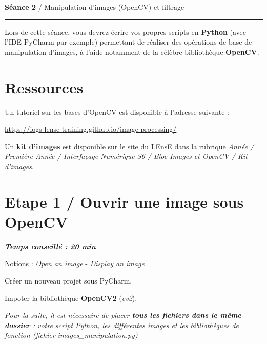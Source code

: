 \documentclass[a4paper,11pt,titlepage]{article} %
\begin{document}
{\noindent\Large \rule[-7pt]{0pt}{30pt} \textbf{Séance 2} / Manipulation d'images (OpenCV) et filtrage} 

\noindent \rule{\linewidth}{1pt}

Lors de cette séance, vous devrez écrire vos propres scripts en \textbf{Python} (avec l'IDE PyCharm par exemple) permettant de réaliser des opérations de base de manipulation d'images, à l'aide notamment de la célèbre bibliothèque \textbf{OpenCV}.

\section{Ressources}

Un tutoriel sur les bases d'OpenCV est disponible à l’adresse suivante : 

\href{https://iogs-lense-training.github.io/image-processing/}{https://iogs-lense-training.github.io/image-processing/}

Un \textbf{kit d'images} est disponible sur le site du LEnsE dans la rubrique \textit{Année / Première Année / Interfaçage Numérique S6 / Bloc Images et OpenCV / Kit d'images}. 


\section{Etape 1 / Ouvrir une image sous OpenCV}

\begin{center} \textbf{\textit{Temps conseillé : 20 min}} \end{center}

\begin{mdframed}[style=sidebar,frametitle={}]
Notions : \href{https://iogs-lense-training.github.io/image-processing/contents/opencv.html#open-an-image
}{\textit{Open an image}} - \href{https://iogs-lense-training.github.io/image-processing/contents/opencv.html#display-an-image
}{\textit{Display an image}}
\end{mdframed}

\Manip Créer un nouveau projet sous PyCharm.

\Manip Impoter la bibliothèque \textbf{OpenCV2} (\textit{cv2}).

\medskip

\textit{Pour la suite, il est nécessaire de placer \textbf{tous les fichiers dans le même dossier} : votre script Python, les
différentes images et les bibliothèques de fonction (fichier \textsl{images\_manipulation.py})}
\end{document}
